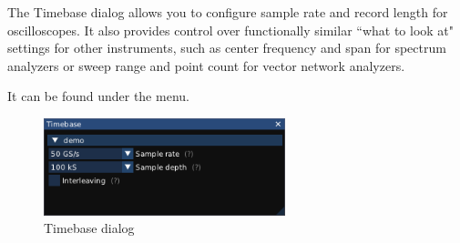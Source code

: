 The Timebase dialog allows you to configure sample rate and record length for oscilloscopes. It also provides control
over functionally similar ``what to look at" settings for other instruments, such as center frequency and span for
spectrum analyzers or sweep range and point count for vector network analyzers.

It can be found under the  menu.

\begin{figure}[H]
\centering
\includegraphics[width=7cm]{ng-images/dialog-timebase.png}
\caption{Timebase dialog}
\label{timebase}
\end{figure}
